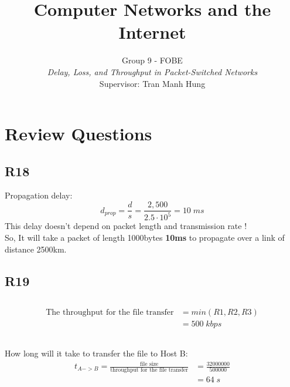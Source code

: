 \documentclass[journal]{IEEEtran}
\begin{document}
\title{Computer Networks and the Internet}

\author{Group 9 - FOBE\\
				\textit{Delay, Loss, and Throughput in Packet-Switched Networks}\\
				Supervisor: Tran Manh Hung\\
} 



\maketitle





\section{Review Questions}	
\subsection*{R18}

Propagation delay:
\begin{equation*} 
    d_{prop} = \frac{d}{s} = \frac{2,500}{2.5 \cdot 10^5} = 10\;ms
\end{equation*}
This delay doesn't depend on packet length and transmission rate ! \\

So, It will take a packet of length 1000\;bytes \textbf{10\;ms} to
propagate over a link of distance 2500\;km.

\subsection*{R19}
\subsection{}
\begin{equation*} 
  \begin{split}
    \text{The throughput for the file transfer} & = min(R1, R2, R3) \\
   & = 500\;kbps
  \end{split}
\end{equation*}
\subsection{}
How long will it take to transfer the file to Host B:
\begin{equation*}
  \begin{split}
  t_{A->B}=\frac{\text{file size}}{\text{throughput for the file transfer}} & = \frac{32000000}{500000} \\
  & = 64\;s
  \end{split}
\end{equation*}
\end{document}
